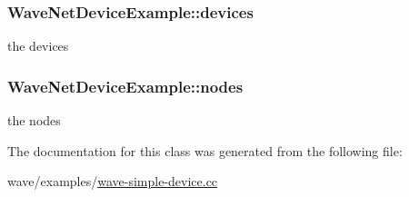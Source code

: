 \subsubsection[{\texorpdfstring{devices}{devices}}]{ Wave\+Net\+Device\+Example\+::devices\hspace{0.3cm}{\ttfamily [private]}}\hypertarget{classWaveNetDeviceExample_a4b88c787809e6171c04eba282d1a1715}{}\label{classWaveNetDeviceExample_a4b88c787809e6171c04eba282d1a1715}


the devices 

\subsubsection[{\texorpdfstring{nodes}{nodes}}]{ Wave\+Net\+Device\+Example\+::nodes\hspace{0.3cm}{\ttfamily [private]}}\hypertarget{classWaveNetDeviceExample_a8a97f5513275ce36c7f3f8d0dabd5a68}{}\label{classWaveNetDeviceExample_a8a97f5513275ce36c7f3f8d0dabd5a68}


the nodes 



The documentation for this class was generated from the following file\+:\begin{DoxyCompactItemize}
\item 
wave/examples/\hyperlink{wave-simple-device_8cc}{wave-\/simple-\/device.\+cc}\end{DoxyCompactItemize}
